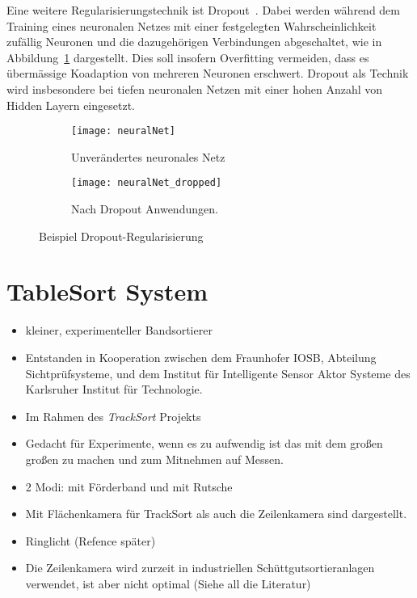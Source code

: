 
Eine weitere Regularisierungstechnik ist Dropout~\cite{JMLR:v15:srivastava14a}.
Dabei werden während dem Training eines neuronalen Netzes 
mit einer festgelegten Wahrscheinlichkeit zufällig Neuronen und die dazugehörigen Verbindungen abgeschaltet, 
wie in Abbildung~\ref{fig:dropout} dargestellt.
Dies soll insofern Overfitting vermeiden, dass es übermässige Koadaption von mehreren Neuronen erschwert.
Dropout als Technik wird insbesondere bei tiefen neuronalen Netzen mit einer hohen Anzahl von Hidden Layern eingesetzt. 

\begin{figure}[h]
    \centering
    \begin{subfigure}[t]{0.4\textwidth}
		\texttt{[image: neuralNet]}
		\caption{Unverändertes neuronales Netz}
    \end{subfigure}
    \begin{subfigure}[t]{0.4\textwidth}
		\texttt{[image: neuralNet\_dropped]}
		\caption{Nach Dropout Anwendungen.}
	\end{subfigure}
    \caption{Beispiel Dropout-Regularisierung~\cite{JMLR:v15:srivastava14a}}
    \label{fig:dropout}
\end{figure}


\section{TableSort System}

\color{blue}

\begin{itemize}
	\item kleiner, experimenteller Bandsortierer~\cite{doll2015}
	\item Entstanden in Kooperation zwischen dem Fraunhofer IOSB, Abteilung Sichtprüfsysteme, und dem Institut für Intelligente Sensor Aktor Systeme des Karlsruher Institut für Technologie.
	\item Im Rahmen des \textit{TrackSort} Projekts
	\item Gedacht für Experimente, wenn es zu aufwendig ist das mit dem großen großen zu machen und zum Mitnehmen auf Messen.
	\item 2 Modi: mit Förderband und mit Rutsche
	\item Mit Flächenkamera für TrackSort als auch die Zeilenkamera sind dargestellt.
	\item Ringlicht (Refence später)
	\item Die Zeilenkamera wird zurzeit in industriellen Schüttgutsortieranlagen verwendet, ist aber nicht optimal (Siehe all die Literatur)
\end{itemize}
\color{black}


